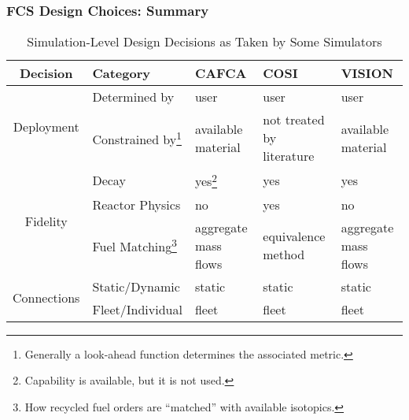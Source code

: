 \begin{frame}[ctb!]
  \frametitle{FCS Design Choices: Summary}

  \fontsize{7pt}{\baselineskip}\selectfont
  
  \begin{table} [h!]
    \begin{tabularx}{\textwidth}{|c|X|X|X|X|}
      \hline
      Decision                     & Category & CAFCA & COSI & VISION \\ 
      \hline
      \multirow{2}{*}{Deployment}  & Determined by 
      & user & user & user \\ \cline{2-5}
      & Constrained by\footnote{Generally a look-ahead function determines the associated metric.}   
      & available material & not treated by literature & available material \\ \hline
      \multirow{3}{*}{Fidelity}    & Decay 
      & yes\footnote{Capability is available, but it is not used.} & yes & yes \\ \cline{2-5}
      & Reactor Physics 
      & no & yes & no \\ \cline{2-5}
      & Fuel Matching\footnote{How recycled fuel orders are ``matched'' with available isotopics.} 
      & aggregate mass flows & equivalence method & aggregate mass flows \\ \hline
      \multirow{2}{*}{Connections} & Static/Dynamic 
      & static & static & static \\ \cline{2-5}
      & Fleet/Individual 
      & fleet & fleet & fleet \\
      \hline
    \end{tabularx}
    \caption{Simulation-Level Design Decisions as Taken by Some Simulators}
    \label{tab:sim-summary}
  \end{table}

\end{frame}